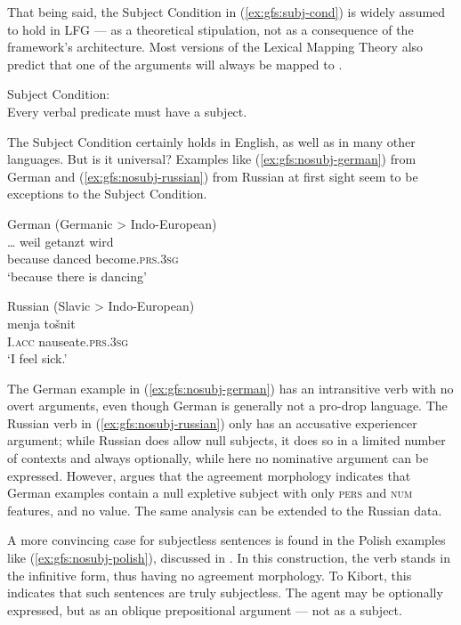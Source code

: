 \documentclass[output=paper]{../langscibook}
\begin{document}
 That being said, the Subject Condition in (\ref{ex:gfs:subj-cond}) is widely assumed to hold in LFG \citep{bresnan1989locative} --- as a theoretical stipulation, not as a consequence of the framework's architecture. Most versions of the Lexical Mapping Theory also predict that one of the arguments will always be mapped to \SUBJ.
 
 \ea\label{ex:gfs:subj-cond}
    \textup{Subject Condition:}\\
    \textup{Every verbal predicate must have a subject.}
 \z
 
 The Subject Condition certainly holds in English, as well as in many other languages. But is it universal? Examples like (\ref{ex:gfs:nosubj-german}) from German and (\ref{ex:gfs:nosubj-russian}) from Russian at first sight seem to be exceptions to the Subject Condition.
 
 \ea\label{ex:gfs:nosubj-german} German (Germanic > Indo-European)\\
    \gll … weil getanzt wird\\
    {} because danced become.\textsc{prs.3sg}\\
    \glt `because there is dancing' 
    
    \ex\label{ex:gfs:nosubj-russian} Russian (Slavic > Indo-European)\\
    \gll menja tošnit\\
    I.\textsc{acc} nauseate.\textsc{prs.3sg}\\
    \glt `I feel sick.'
 \z
 
 The German example in (\ref{ex:gfs:nosubj-german}) has an intransitive verb with no overt arguments, even though German is generally not a pro-drop language. The Russian verb in (\ref{ex:gfs:nosubj-russian}) only has an accusative experiencer argument; while Russian does allow null subjects, it does so in a limited number of contexts and always optionally, while here no nominative argument can be expressed. However, \citet{berman1999,Berman2003} argues that the agreement morphology indicates that German examples contain a null expletive subject with only \textsc{pers} and \textsc{num} features, and no \PRED value. The same analysis can be extended to the Russian data.
 
 A more convincing case for subjectless sentences is found in the Polish examples like (\ref{ex:gfs:nosubj-polish}), discussed in \citet{Kibort2006}. In this construction, the verb stands in the infinitive form, thus having no agreement morphology. To Kibort, this indicates that such sentences are truly subjectless. The agent may be optionally expressed, but as an oblique prepositional argument --- not as a subject.
 
\end{document}
